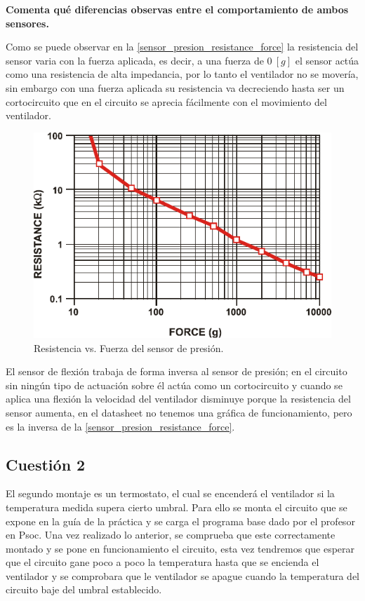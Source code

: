 \documentclass[11pt,a4paper]{article}
\begin{document}
\textbf{Comenta qué diferencias observas entre el comportamiento de ambos sensores.}

Como se puede observar en la \autoref{sensor_presion_resistance_force} la resistencia del sensor varia con la fuerza aplicada, es decir, a una fuerza de $0 \ [g]$ el sensor actúa como una resistencia de alta impedancia, por lo tanto el ventilador no se movería, sin embargo con una fuerza aplicada su resistencia va decreciendo hasta ser un cortocircuito que en el circuito se aprecia fácilmente con el movimiento del ventilador.

\begin{figure}[H]
    \centering
    \includegraphics[scale=1]{images/IE_practica_3_sensor_presion_datasheet.pdf}
    \caption{Resistencia vs. Fuerza del sensor de presión.}
    \label{sensor_presion_resistance_force}
\end{figure}

El sensor de flexión trabaja de forma inversa al sensor de presión; en el circuito sin ningún tipo de actuación sobre él actúa como un cortocircuito y cuando se aplica una flexión la velocidad del ventilador disminuye porque la resistencia del sensor aumenta, en el datasheet no tenemos una gráfica de funcionamiento, pero es la inversa de la \autoref{sensor_presion_resistance_force}.


\subsection*{Cuestión 2}
El segundo montaje es un termostato, el cual se encenderá el ventilador si la temperatura medida supera cierto umbral. Para ello se monta el circuito que se expone en la guía de la práctica y se carga el programa base dado por el profesor en Psoc. Una vez realizado lo anterior, se comprueba que este correctamente montado y se pone en funcionamiento el circuito, esta vez tendremos que esperar que el circuito gane poco a poco la temperatura hasta que se encienda el ventilador y se comprobara que le ventilador se apague cuando la temperatura del circuito baje del umbral establecido.
\end{document}

